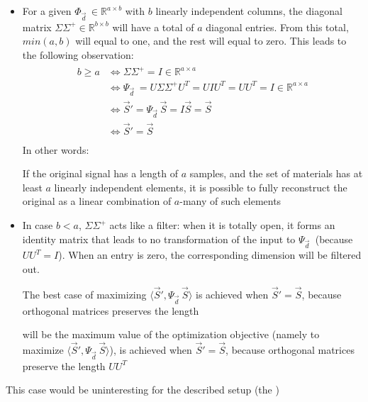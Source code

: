 \documentclass[11pt]{scrartcl} %
\begin{document}
  \begin{itemize}
  \item For a given \( \Phi_{\vec{d}\;}\in\mathbb{R}^{a\times b}\) with \(b\) linearly independent columns, the diagonal matrix \(\Sigma \Sigma^+\in\mathbb{R}^{b\times b}\) will have a total of \(a\) diagonal entries. From this total, \(min(a,b)\) will equal to one, and the rest will equal to zero. This leads to the following observation:
    \begin{align*}
      \begin{aligned}
        b\geq a &\iff \Sigma \Sigma^+ = I\in\mathbb{R}^{a\times a}\\
        &\iff \Psi_{\vec{d}\;} = U\Sigma \Sigma^+ U^T = UIU^T = UU^T = I\in\mathbb{R}^{a\times a}\\
        &\iff \vec{S}' = \Psi_{\vec{d}\;}\vec{S} = I\vec{S} = \vec{S}\\
        &\iff \vec{S}' = \vec{S}\\
        \end{aligned}
    \end{align*}
    In other words:
    \begin{tcolorbox}
      If the original signal has a length of \(a\) samples, and the set of materials has at least \(a\) linearly independent elements, it is possible to fully reconstruct the original as a linear combination of \(a\)-many of such elements
    \end{tcolorbox}
  \item In case \(b<a\), \(\Sigma\Sigma^+\) acts like a filter: when it is totally open, it forms an identity matrix that leads to no transformation of the input to \( \Psi_{\vec{d}\;}\) (because \(UU^T=I\)). When an entry is zero, the corresponding dimension will be filtered out.
    \begin{tcolorbox}
      The best case of maximizing \(\langle \vec{S}', \Psi_{\vec{d}\;}\vec{S} \rangle\) is achieved when \(\vec{S}' = \vec{S}\), because orthogonal matrices preserves the length
    \end{tcolorbox}


    will be  the maximum value of the optimization objective (namely to maximize \(\langle \vec{S}', \Psi_{\vec{d}\;}\vec{S} \rangle\)), is achieved when \(\vec{S}' = \vec{S}\), because orthogonal matrices preserve the length \(UU^T\)
  \end{itemize}
  This case would be uninteresting for the described setup (the )
\end{document}
